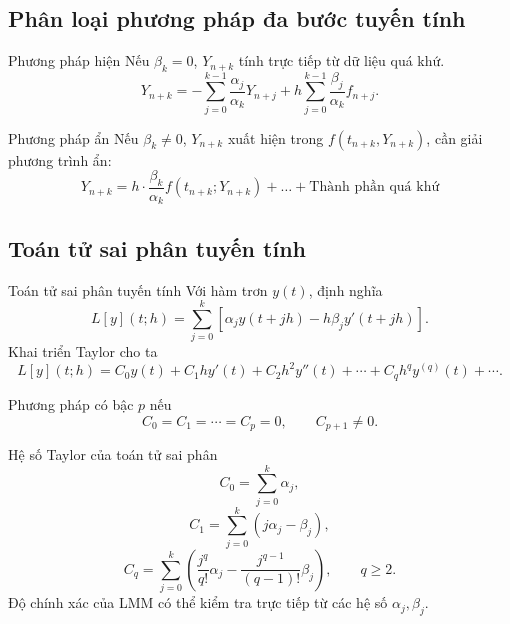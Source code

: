 \documentclass[aspectratio=43]{beamer}
\begin{document}
\subsection*{Phân loại phương pháp đa bước tuyến tính }
\begin{frame}

\begin{baitapbox}{Phương pháp hiện}
Nếu $\beta_k=0$, $Y_{n+k}$ tính trực tiếp từ dữ liệu quá khứ.
\[
Y_{n+k}= -\sum_{j=0}^{k-1}\frac{\alpha_j}{\alpha_k}Y_{n+j}
+h\sum_{j=0}^{k-1}\frac{\beta_j}{\alpha_k}f_{n+j}.
\]
\end{baitapbox}

\begin{baitapbox}{Phương pháp ẩn}
Nếu $\beta_k\ne0$, $Y_{n+k}$ xuất hiện trong $f(t_{n+k},Y_{n+k})$, cần giải phương trình ẩn:
\[
Y_{n+k} = h\cdot\frac{\beta_k}{\alpha_k}f(t_{n+k};Y_{n+k}) + \dots + \text{Thành phần quá khứ}
\]
\end{baitapbox}

\end{frame}
\subsection*{Toán tử sai phân tuyến tính}
\begin{frame}
\begin{baitapbox}{Toán tử sai phân tuyến tính}
Với hàm trơn $y(t)$, định nghĩa
\[
 L[y](t;h)=\sum_{j=0}^{k}\left[\alpha_jy(t+jh)-h\beta_jy'(t+jh)\right].
\]
Khai triển Taylor cho ta
\[
 L[y](t;h)=C_0y(t)+C_1hy'(t)+C_2h^2y''(t)+\cdots+C_qh^qy^{(q)}(t)+\cdots.
\]
\end{baitapbox}
\begin{tcolorbox}[title={Bậc chính xác}, colback=softgreen, colframe=tealgreen, colbacktitle=tealgreen]
Phương pháp có bậc $p$ nếu
\[
 C_0=C_1=\cdots=C_p=0,\qquad C_{p+1}\ne0.
\]
\end{tcolorbox}
\end{frame}

\begin{frame}
\begin{baitapbox}{Hệ số Taylor của toán tử sai phân}
\[
 C_0=\sum_{j=0}^{k}\alpha_j,
\]
\[
 C_1=\sum_{j=0}^{k}(j\alpha_j-\beta_j),
\]
\[
 C_q=\sum_{j=0}^{k}\left(\frac{j^q}{q!}\alpha_j-\frac{j^{q-1}}{(q-1)!}\beta_j\right),\qquad q\ge 2.
\]
Độ chính xác của LMM có thể kiểm tra trực tiếp từ các hệ số $\alpha_j,\beta_j$.
\end{baitapbox}
\end{frame}
\end{document}
